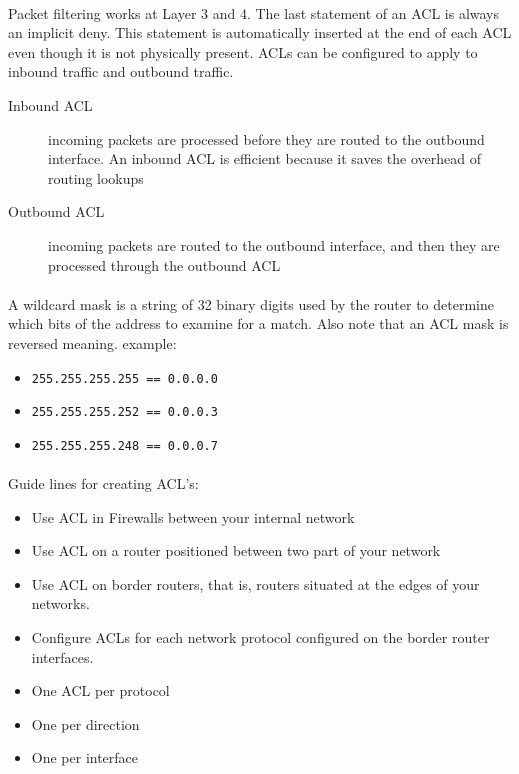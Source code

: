 \documentclass[10pt,landscape]{article}
\begin{document}
\begin{multicols}{3}
\paragraph{}
Packet filtering works at Layer 3 and 4. The last statement of an ACL is always an implicit deny. This statement is automatically inserted at the end of each ACL even though it is not physically present. ACLs can be configured to apply to inbound traffic and outbound traffic.
\begin{description}
	\item[Inbound ACL] incoming packets are processed before they are routed to the outbound interface. An inbound ACL is efficient because it saves the overhead of routing lookups
	\item[Outbound ACL] incoming packets are routed to the outbound interface, and then they are processed through the outbound ACL
\end{description}
\paragraph{}
A wildcard mask is a string of 32 binary digits used by the router to determine which bits of the address to examine for a match. Also note that an ACL mask is reversed meaning.
example:
\begin{itemize}
	\item \verb!255.255.255.255 == 0.0.0.0!
	\item \verb!255.255.255.252 == 0.0.0.3!
	\item \verb!255.255.255.248 == 0.0.0.7!
\end{itemize}
\paragraph{}
Guide lines for creating ACL's:
\begin{itemize}
	\item Use ACL in Firewalls between your internal network
	\item Use ACL on a router positioned between two part of your network
	\item Use ACL on border routers, that is, routers situated at the edges of your networks.
	\item Configure ACLs for each network protocol configured on the border router interfaces.
	\item One ACL per protocol
	\item One per direction
	\item One per interface
\end{itemize}

\end{multicols}
\end{document}
